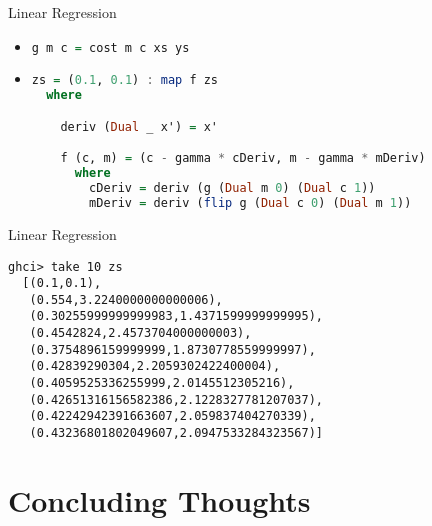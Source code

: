 \documentclass{beamer}
\begin{document}
\begin{frame}[fragile]{Linear Regression}
\begin{itemize}
\item
\begin{scriptsize}
\begin{lstlisting}[language=Haskell]
g m c = cost m c xs ys
\end{lstlisting}
\end{scriptsize}

\pause
\item
\begin{scriptsize}
\begin{lstlisting}[language=Haskell]
zs = (0.1, 0.1) : map f zs
  where

    deriv (Dual _ x') = x'

    f (c, m) = (c - gamma * cDeriv, m - gamma * mDeriv)
      where
        cDeriv = deriv (g (Dual m 0) (Dual c 1))
        mDeriv = deriv (flip g (Dual c 0) (Dual m 1))
\end{lstlisting}
\end{scriptsize}
\end{itemize}
\end{frame}

\begin{frame}[fragile]{Linear Regression}
\begin{scriptsize}
\begin{lstlisting}
ghci> take 10 zs
  [(0.1,0.1),
   (0.554,3.2240000000000006),
   (0.30255999999999983,1.4371599999999995),
   (0.4542824,2.4573704000000003),
   (0.3754896159999999,1.8730778559999997),
   (0.42839290304,2.2059302422400004),
   (0.4059525336255999,2.0145512305216),
   (0.42651316156582386,2.1228327781207037),
   (0.42242942391663607,2.059837404270339),
   (0.43236801802049607,2.0947533284323567)]
\end{lstlisting}
\end{scriptsize}
\end{frame}

\section{Concluding Thoughts}
\end{document}
